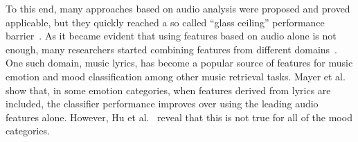 \documentclass{llncs}
\begin{document}
To this end, many approaches based on audio analysis were proposed and proved applicable, but they quickly reached a so called ``glass ceiling'' performance barrier~\cite{DBLP:journals/taslp/LuLZ06}. As it became evident that using features based on audio alone is not enough, many researchers started combining features from different domains~\cite{DBLP:conf/ismir/KimSMMRSST10}.
One such domain, music lyrics, has become a popular source of features for music emotion and mood classification among other music retrieval tasks. Mayer et al.~\cite{DBLP:conf/mm/MayerNR08} show that, in some emotion categories, when features derived from lyrics are included, the classifier performance improves over using the leading audio features alone. However, Hu et al.~\cite{DBLP:conf/ismir/HuDE09} reveal that this is not true for all of the mood categories. 
\end{document}
